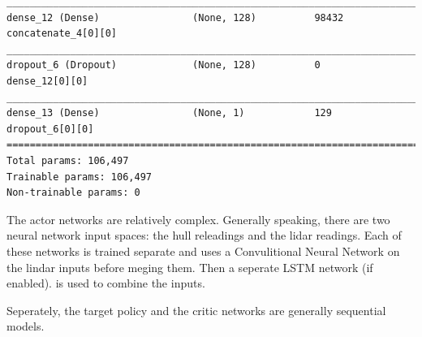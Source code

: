 \documentclass[man, 12pt]{apa6}
\begin{document}
\begin{verbatim}
__________________________________________________________________________________________________
dense_12 (Dense)                (None, 128)          98432       concatenate_4[0][0]              
__________________________________________________________________________________________________
dropout_6 (Dropout)             (None, 128)          0           dense_12[0][0]                   
__________________________________________________________________________________________________
dense_13 (Dense)                (None, 1)            129         dropout_6[0][0]                  
==================================================================================================
Total params: 106,497
Trainable params: 106,497
Non-trainable params: 0
\end{verbatim}

The actor networks are relatively complex. Generally speaking, there are two neural network input spaces: the hull releadings and the lidar readings. Each of these networks is trained separate and uses a Convulitional Neural Network on the lindar inputs before meging them. Then a seperate LSTM network (if enabled). is used to combine the inputs. 

Seperately, the target policy and the critic networks are generally sequential models. 
\end{document}

